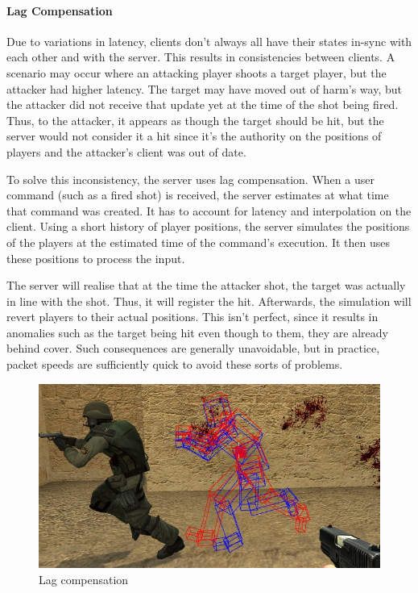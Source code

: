 \documentclass[a4paper, 12pt]{scrartcl}
\begin{document}
\paragraph{Lag Compensation}
Due to variations in latency, clients don't always all have their states in-sync with each other and with the server. This results in consistencies between clients. A scenario may occur where an attacking player shoots a target player, but the attacker had higher latency. The target may have moved out of harm's way, but the attacker did not receive that update yet at the time of the shot being fired. Thus, to the attacker, it appears as though the target should be hit, but the server would not consider it a hit since it's the authority on the positions of players and the attacker's client was out of date.

To solve this inconsistency, the server uses lag compensation. When a user command (such as a fired shot) is received, the server estimates at what time that command was created. It has to account for latency and interpolation on the client. Using a short history of player positions, the server simulates the positions of the players at the estimated time of the command's execution. It then uses these positions to process the input.

The server will realise that at the time the attacker shot, the target was actually in line with the shot. Thus, it will register the hit. Afterwards, the simulation will revert players to their actual positions. This isn't perfect, since it results in anomalies such as the target being hit even though to them, they are already behind cover. Such consequences are generally unavoidable, but in practice, packet speeds are sufficiently quick to avoid these sorts of problems.

\begin{figure}[!htp]
  \centering
  \includegraphics[width=0.66\linewidth]{images/source_net_lag_comp.jpg}
  \caption{Lag compensation}
  \label{fig:source_net_lag_comp}
\end{figure}
\end{document}
